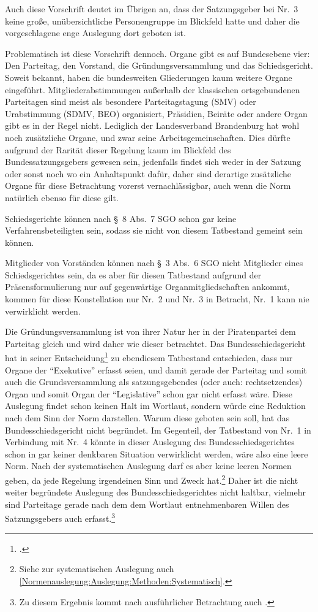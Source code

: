 Auch diese Vorschrift deutet im Übrigen an, dass der Satzungsgeber bei Nr.~3 keine große, unübersichtliche Personengruppe im Blickfeld hatte und daher die vorgeschlagene enge Auslegung dort geboten ist.

Problematisch ist diese Vorschrift dennoch.
Organe gibt es auf Bundesebene vier: Den Parteitag, den Vorstand, die Gründungsversammlung und das Schiedsgericht.
Soweit bekannt, haben die bundesweiten Gliederungen kaum weitere Organe eingeführt.
Mitgliederabstimmungen außerhalb der klassischen ortsgebundenen Parteitagen sind meist als besondere Parteitagstagung (SMV) oder Urabstimmung (SDMV, BEO) organisiert, Präsidien, Beiräte oder andere Organ gibt es in der Regel nicht.
Lediglich der Landesverband Brandenburg hat wohl noch zusätzliche Organe, und zwar seine Arbeitsgemeinschaften.
Dies dürfte aufgrund der Rarität dieser Regelung kaum im Blickfeld des Bundessatzungsgebers gewesen sein, jedenfalls findet sich weder in der Satzung oder sonst noch wo ein Anhaltspunkt dafür, daher sind derartige zusätzliche Organe für diese Betrachtung vorerst vernachlässigbar, auch wenn die Norm natürlich ebenso für diese gilt.

Schiedsgerichte können nach \S~8 Abs.~7 SGO schon gar keine Verfahrensbeteiligten sein, sodass sie nicht von diesem Tatbestand gemeint sein können.

Mitglieder von Vorständen können nach \S~3 Abs.~6 SGO nicht Mitglieder eines Schiedsgerichtes sein, da es aber für diesen Tatbestand aufgrund der Präsensformulierung nur auf gegenwärtige Organmitgliedschaften ankommt, kommen für diese Konstellation nur Nr.~2 und Nr.~3 in Betracht, Nr.~1 kann nie verwirklicht werden.

Die Gründungsversammlung ist von ihrer Natur her in der Piratenpartei dem Parteitag gleich und wird daher wie dieser betrachtet.
Das Bundesschiedsgericht hat in seiner Entscheidung\footnote{\cite{BSGPP100127862}.} zu ebendiesem Tatbestand entschieden, dass nur Organe der \enquote{Exekutive} erfasst seien, und damit gerade der Parteitag und somit auch die Grundsversammlung als satzungsgebendes (oder auch: rechtsetzendes) Organ und somit Organ der \enquote{Legislative} schon gar nicht erfasst wäre.
Diese Auslegung findet schon keinen Halt im Wortlaut, sondern würde eine Reduktion nach dem Sinn der Norm darstellen.
Warum diese geboten sein soll, hat das Bundesschiedsgericht nicht begründet.
Im Gegenteil, der Tatbestand von Nr.~1 in Verbindung mit Nr.~4 könnte in dieser Auslegung des Bundesschiedsgerichtes schon in gar keiner denkbaren Situation verwirklicht werden, wäre also eine leere Norm.
Nach der systematischen Auslegung darf es aber keine leeren Normen geben, da jede Regelung irgendeinen Sinn und Zweck hat.\footnote{Siehe zur systematischen Auslegung auch \ref{Normenauslegung:Auslegung:Methoden:Systematisch}.}
Daher ist die nicht weiter begründete Auslegung des Bundesschiedsgerichtes nicht haltbar, vielmehr sind Parteitage gerade nach dem dem Wortlaut entnehmenbaren Willen des Satzungsgebers auch erfasst.\footnote{Zu diesem Ergebnis kommt nach ausführlicher Betrachtung auch \cite[2 ff. mwN.]{LSGBB153}.}

